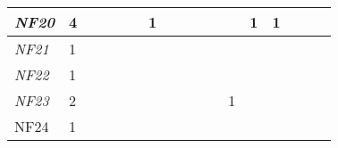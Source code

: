 \begin{table}[]
{\begin{tabular}{|l|l|l|l|l|l|l|l|l|l|l|l|l|l|l|l|l|}
\textit{NF20} & 4                                                     &                                                       &    &                                                       &    & 1                                                     &                                                       &    &    &                                                       &    & 1                                                & 1                                                &    &    &    \\ \hline
\textit{NF21} & 1                                                     &                                                       &    &                                                       &    &                                                       &                                                       &    &    &                                                       &    &                                                  &                                                  &    &    &    \\ \hline
\textit{NF22} & 1                                                     &                                                       &    &                                                       &    &                                                       &                                                       &    &    &                                                       &    &                                                  &                                                  &    &    &    \\ \hline
\textit{NF23} & 2                                                     &                                                       &    &                                                       &    &                                                       &                                                       &    &    &                                                       & 1  &                                                  &                                                  &    &    &    \\ \hline
NF24          & 1                                                     &                                                       &    &                                                       &    &                                                       &                                                       &    &    &                                                       &    &                                                  &                                                  &    &    &    \\ \hline

\end{tabular}}
\end{table}
